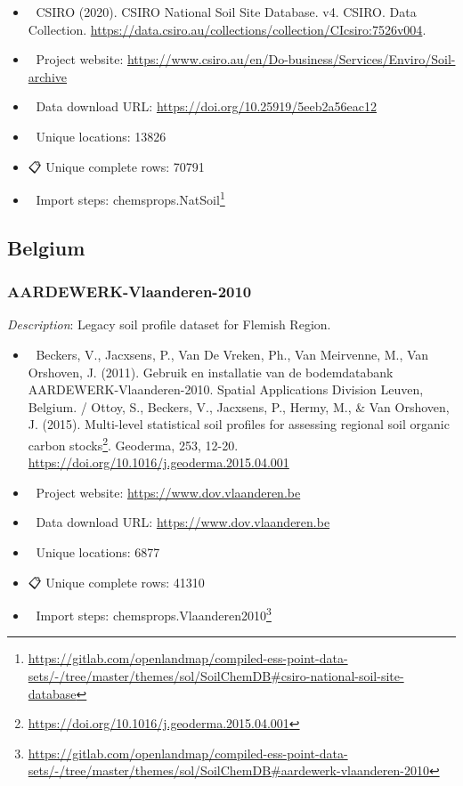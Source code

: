 \documentclass[
  graybox,natbib,nospthms]{svmono}
\providecommand{\tightlist}{%
  \setlength{\itemsep}{0pt}\setlength{\parskip}{0pt}}
\providecommand{\tightlist}{\setlength{\itemsep}{0pt}\setlength{\parskip}{0pt}}
\renewcommand{\href}[2]{#2 (\url{#1})}
\renewcommand{\href}[2]{#2\footnote{\url{#1}}}
\begin{document}
\begin{itemize}
\tightlist
\item
  📕 CSIRO (2020). CSIRO National Soil Site Database. v4. CSIRO. Data Collection. \url{https://data.csiro.au/collections/collection/CIcsiro:7526v004}.\\
\item
  🔗 Project website: \url{https://www.csiro.au/en/Do-business/Services/Enviro/Soil-archive}\\
\item
  📂 Data download URL: \url{https://doi.org/10.25919/5eeb2a56eac12}\\
\item
  📍 Unique locations: 13826\\
\item
  📋 Unique complete rows: 70791\\
\item
  📝 Import steps: \href{https://gitlab.com/openlandmap/compiled-ess-point-data-sets/-/tree/master/themes/sol/SoilChemDB\#csiro-national-soil-site-database}{chemsprops.NatSoil}
\end{itemize}

\hypertarget{belgium}{%
\subsection{Belgium}\label{belgium}}

\hypertarget{aardewerk-vlaanderen-2010}{%
\subsubsection{AARDEWERK-Vlaanderen-2010}\label{aardewerk-vlaanderen-2010}}

\emph{Description}: Legacy soil profile dataset for Flemish Region.

\begin{itemize}
\tightlist
\item
  📕 Beckers, V., Jacxsens, P., Van De Vreken, Ph., Van Meirvenne, M., Van Orshoven, J. (2011). Gebruik en installatie van de bodemdatabank AARDEWERK-Vlaanderen-2010. Spatial Applications Division Leuven, Belgium. / Ottoy, S., Beckers, V., Jacxsens, P., Hermy, M., \& Van Orshoven, J. (2015). \href{https://doi.org/10.1016/j.geoderma.2015.04.001}{Multi-level statistical soil profiles for assessing regional soil organic carbon stocks}. Geoderma, 253, 12-20. \url{https://doi.org/10.1016/j.geoderma.2015.04.001}\\
\item
  🔗 Project website: \url{https://www.dov.vlaanderen.be}\\
\item
  📂 Data download URL: \url{https://www.dov.vlaanderen.be}\\
\item
  📍 Unique locations: 6877
\item
  📋 Unique complete rows: 41310
\item
  📝 Import steps: \href{https://gitlab.com/openlandmap/compiled-ess-point-data-sets/-/tree/master/themes/sol/SoilChemDB\#aardewerk-vlaanderen-2010}{chemsprops.Vlaanderen2010}
\end{itemize}
\end{document}
